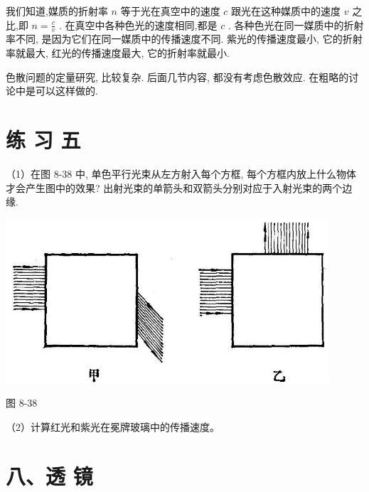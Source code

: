 \documentclass[10pt]{article}
\begin{document}
\begin{center}
\end{center}

我们知道,媒质的折射率 \(n\) 等于光在真空中的速度 \(c\) 跟光在这种媒质中的速度 \(v\) 之比,即 \(n = \frac{c}{v}\) . 在真空中各种色光的速度相同,都是 \(c\) . 各种色光在同一媒质中的折射率不同, 是因为它们在同一媒质中的传播速度不同. 紫光的传播速度最小, 它的折射率就最大, 红光的传播速度最大, 它的折射率就最小.

色散问题的定量研究, 比较复杂. 后面几节内容, 都没有考虑色散效应. 在粗略的讨论中是可以这样做的.

\section*{练 习 五}

（1）在图 8-38 中, 单色平行光束从左方射入每个方框, 每个方框内放上什么物体才会产生图中的效果? 出射光束的单箭头和双箭头分别对应于入射光束的两个边缘.

\begin{center}
\includegraphics[max width=0.9\textwidth]{images/01913056-1f15-74d8-9184-9aab52c9d66b_273_644389.jpg}
\end{center}

图 8-38

（2）计算红光和紫光在冕牌玻璃中的传播速度。

\section*{八、透 镜}
\end{document}
